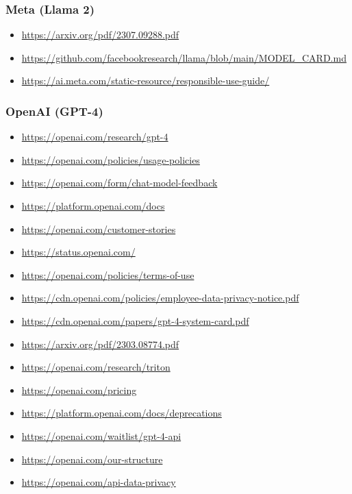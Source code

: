 \subsubsection{Meta (Llama 2)}
\begin{itemize}
\item \url{https://arxiv.org/pdf/2307.09288.pdf}
\item \url{https://github.com/facebookresearch/llama/blob/main/MODEL_CARD.md}
\item \url{https://ai.meta.com/static-resource/responsible-use-guide/}
\end{itemize}

\clearpage

\subsubsection{OpenAI (GPT-4)}
\begin{itemize}
\item \url{https://openai.com/research/gpt-4}
\item \url{https://openai.com/policies/usage-policies}
\item \url{https://openai.com/form/chat-model-feedback}
\item \url{https://platform.openai.com/docs}
\item \url{https://openai.com/customer-stories}
\item \url{https://status.openai.com/}
\item \url{https://openai.com/policies/terms-of-use}
\item \url{https://cdn.openai.com/policies/employee-data-privacy-notice.pdf}
\item \url{https://cdn.openai.com/papers/gpt-4-system-card.pdf}
\item \url{https://arxiv.org/pdf/2303.08774.pdf}
\item \url{https://openai.com/research/triton}
\item \url{https://openai.com/pricing}
\item \url{https://platform.openai.com/docs/deprecations}
\item \url{https://openai.com/waitlist/gpt-4-api}
\item \url{https://openai.com/our-structure}
\item \url{https://openai.com/api-data-privacy}
\end{itemize}

